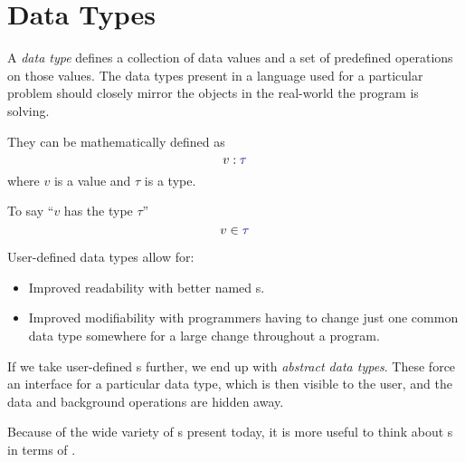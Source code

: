\section{Data Types}\label{sec:Data_Types}
\begin{definition}\label{def:Data_Type}
  A \emph{data type} defines a collection of data values and a set of predefined operations on those values.
  The data types present in a language used for a particular problem should closely mirror the objects in the real-world the program is solving.

  They can be mathematically defined as
  \begin{equation}\label{eq:Data_Type}
    v : \DataType
  \end{equation}
  where $v$ is a value and $\tau$ is a type.

  \begin{remark}\label{rmk:Has_the_Type}
    To say ``$v$ has the type $\tau$''
    \begin{equation}\label{eq:Has_the_Type}
      v \in \DataType
    \end{equation}
  \end{remark}
\end{definition}

User-defined data types allow for:
\begin{itemize}[noitemsep]
\item Improved readability with better named s.
\item Improved modifiability with programmers having to change just one common data type somewhere for a large change throughout a program.
\end{itemize}

If we take user-defined s further, we end up with \emph{abstract data types}.
These force an interface for a particular data type, which is then visible to the user, and the data and background operations are hidden away.

Because of the wide variety of s present today, it is more useful to think about s in terms of .

